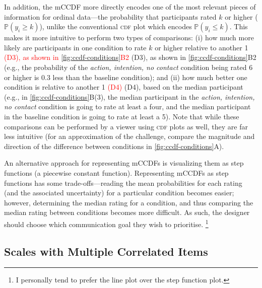 \documentclass{vgtc}                          %
\newcommand{\ccdf}[1]{mCCDF#1}
\def\trackchanges{0}
\newcommand{\new}[1]{%
\if\trackchanges1%
\textcolor{red}{#1}%
\else#1\fi}
\begin{document}
In addition, the \ccdf{} more directly encodes one of the most relevant pieces of information for ordinal data---the probability that participants rated $k$ or higher ($\mathbb{P}(y_i \geq k)$), unlike the conventional \textsc{cdf} plot which encodes $\mathbb{P}(y_i \leq k)$. This makes it more intuitive to perform two types of comparisons: (i) how much more likely are participants in one condition to rate $k$ or higher relative to another \new{(D3), as shown in \autoref{fig:ccdf-conditions}B2} (e.g., the probability of the \textit{action, intention, no contact} condition being rated 6 or higher is 0.3 less than the baseline condition); and (ii) how much better one condition is relative to another \new{(D4)}, based on the median participant (e.g., in \autoref{fig:ccdf-conditions}B(3), the median participant in the \textit{action, intention, no contact} condition is going to rate at least a four, and the median participant in the baseline condition is going to rate at least a 5). Note that while these comparisons can be performed by a viewer using \textsc{cdf} plots as well, they are far less intuitive (for an approximation of the challenge, compare the magnitude and direction of the difference between conditions in \autoref{fig:ccdf-conditions}A).

An alternative approach for representing \ccdf{s} is visualizing them as step functions (a piecewise constant function). Representing \ccdf{s} as step functions has some trade-offs---reading the mean probabilities for each rating (and the associated uncertainty) for a particular condition becomes easier; however, determining the median rating for a condition, and thus comparing the median rating between conditions becomes more difficult. As such, the designer should choose which communication goal they wish to prioritise.
\footnote{I personally tend to prefer the line plot over the step function plot.}

\subsection{Scales with Multiple Correlated Items}
\end{document}
